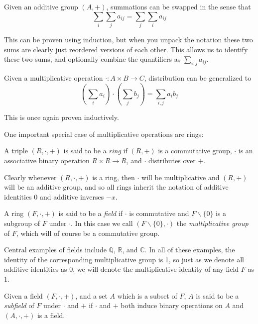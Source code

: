 \begin{prop}Given an additive group $(A, +)$, summations can be swapped in the sense that
	\[\sum_i\sum_j a_{ij} = \sum_j\sum_i a_{ij}\]
\end{prop}
This can be proven using induction, but when you unpack the notation these two sums are clearly just reordered versions of each other. This allows us to identify these two sums, and optionally combine the quantifiers as $\sum_{i,j} a_{ij}$.

\begin{prop}Given a multiplicative operation $\cdot: A \times B \to C$, distribution can be generalized to
\[(\sum_i a_i)\cdot (\sum_j b_j) = \sum_{i,j} a_ib_j\]
\end{prop}
This is once again proven inductively.

One important special case of multiplicative operations are rings:
\begin{define}[Rings] A triple $(R, \cdot, +)$ is said to be a \emph{ring} if $(R, +)$ is a commutative group, $\cdot$ is an associative binary operation $R \times R \to R$, and $\cdot$ distributes over $+$.
\end{define}
Clearly whenever $(R, \cdot, +)$ is a ring, then $\cdot$ will be multiplicative and $(R, +)$ will be an additive group, and so all rings inherit the notation of additive identities 0 and additive inverses $-x$.

\begin{define} A ring $(F, \cdot, +)$ is said to be a \emph{field} if $\cdot$ is commutative and $F \backslash \{0\}$ is a subgroup of $F$ under $\cdot$. In this case we call $(F\backslash\{0\}, \cdot)$ the \emph{multiplicative group} of $F$, which will of course be a commutative group.
\end{define}

Central examples of fields include $\mathbb{Q}$, $\mathbb{R}$, and $\mathbb{C}$. In all of these examples, the identity of the corresponding multiplicative group is 1, so just as we denote all additive identities as 0, we will denote the multiplicative identity of any field $F$ as 1.

\begin{define}[Subfield] Given a field $(F, \cdot, +)$, and a set $A$ which is a subset of $F$, $A$ is said to be a \emph{subfield} of $F$ under $\cdot$ and $+$ if $\cdot$ and $+$ both induce binary operations on $A$ and $(A, \cdot, +)$ is a field.
\end{define}

